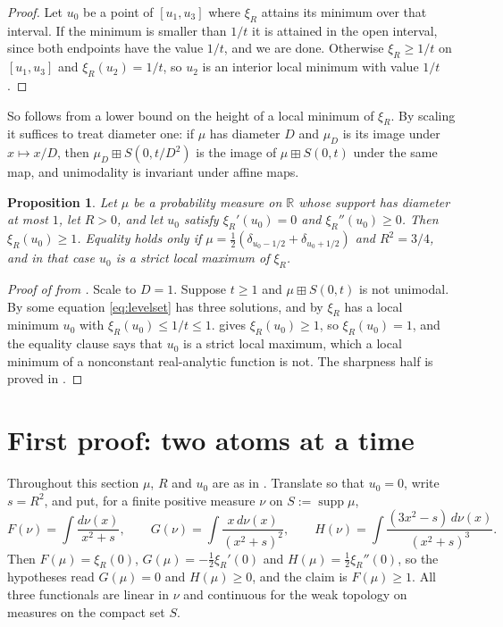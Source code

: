 \documentclass[11pt]{amsart}
\newtheorem{proposition}[theorem]{Proposition}
\theoremstyle{definition}
\newcommand{\R}{\mathbb{R}}
\newcommand{\bp}{\boxplus}
\newcommand{\supp}{\operatorname{supp}}
\begin{document}
\begin{proof}
Let $u_0$ be a point of $[u_1,u_3]$ where $\xi_R$ attains its minimum over that interval. If the minimum is smaller than $1/t$ it is attained in the open interval, since both endpoints have the value $1/t$, and we are done. Otherwise $\xi_R\ge 1/t$ on $[u_1,u_3]$ and $\xi_R(u_2)=1/t$, so $u_2$ is an interior local minimum with value $1/t$.
\end{proof}

So  follows from a lower bound on the height of a local minimum of $\xi_R$. By scaling it suffices to treat diameter one: if $\mu$ has diameter $D$ and $\mu_D$ is its image under $x\mapsto x/D$, then $\mu_D\bp S(0,t/D^2)$ is the image of $\mu\bp S(0,t)$ under the same map, and unimodality is invariant under affine maps.

\begin{proposition}\label{prop:height}
Let $\mu$ be a probability measure on $\R$ whose support has diameter at most $1$, let $R>0$, and let $u_0$ satisfy $\xi_R'(u_0)=0$ and $\xi_R''(u_0)\ge 0$. Then $\xi_R(u_0)\ge 1$. Equality holds only if $\mu=\frac12(\delta_{u_0-1/2}+\delta_{u_0+1/2})$ and $R^2=3/4$, and in that case $u_0$ is a strict local maximum of $\xi_R$.
\end{proposition}

\begin{proof}[Proof of  from ]
Scale to $D=1$. Suppose $t\ge 1$ and $\mu\bp S(0,t)$ is not unimodal. By  some equation \eqref{eq:levelset} has three solutions, and by  $\xi_R$ has a local minimum $u_0$ with $\xi_R(u_0)\le 1/t\le 1$.  gives $\xi_R(u_0)\ge 1$, so $\xi_R(u_0)=1$, and the equality clause says that $u_0$ is a strict local maximum, which a local minimum of a nonconstant real-analytic function is not. The sharpness half is proved in .
\end{proof}

\section{First proof: two atoms at a time}\label{sec:choquet}

Throughout this section $\mu$, $R$ and $u_0$ are as in . Translate so that $u_0=0$, write $s=R^2$, and put, for a finite positive measure $\nu$ on $S:=\supp\mu$,
\begin{equation}\label{eq:FGH}
F(\nu)=\int\frac{d\nu(x)}{x^2+s},\qquad
G(\nu)=\int\frac{x\,d\nu(x)}{(x^2+s)^2},\qquad
H(\nu)=\int\frac{(3x^2-s)\,d\nu(x)}{(x^2+s)^3}.
\end{equation}
Then $F(\mu)=\xi_R(0)$, $G(\mu)=-\frac12\xi_R'(0)$ and $H(\mu)=\frac12\xi_R''(0)$, so the hypotheses read $G(\mu)=0$ and $H(\mu)\ge0$, and the claim is $F(\mu)\ge 1$. All three functionals are linear in $\nu$ and continuous for the weak topology on measures on the compact set $S$.
\end{document}
